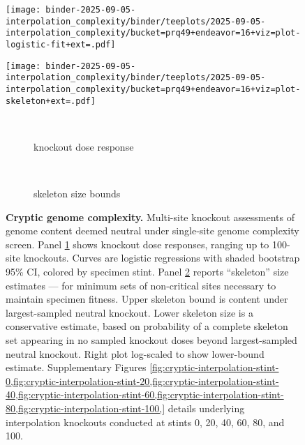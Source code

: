 \begin{figure}

\begin{minipage}{\linewidth}
\centering
\begin{minipage}{0.4\linewidth}
\texttt{[image: binder-2025-09-05-interpolation\_complexity/binder/teeplots/2025-09-05-interpolation\_complexity/bucket=prq49+endeavor=16+viz=plot-logistic-fit+ext=.pdf]}
\end{minipage}%
\begin{minipage}{0.6\linewidth}
\texttt{[image: binder-2025-09-05-interpolation\_complexity/binder/teeplots/2025-09-05-interpolation\_complexity/bucket=prq49+endeavor=16+viz=plot-skeleton+ext=.pdf]}
\end{minipage}
\end{minipage}

\vspace{-1ex}\textsc{}

\begin{minipage}{\linewidth}
\centering
\begin{subfigure}[t]{0.05\linewidth}
~
\end{subfigure}%
\begin{subfigure}[t]{0.4\linewidth}
\centering
\caption{\footnotesize knockout dose response}
\label{fig:cryptic:logistic}
\end{subfigure}%
\begin{subfigure}[t]{0.05\linewidth}
~
\end{subfigure}%
\begin{subfigure}[t]{0.5\linewidth}
\centering
\caption{\footnotesize skeleton size bounds}
\label{fig:cryptic:skeleton}
\end{subfigure}
\end{minipage}

\caption{
\textbf{Cryptic genome complexity.}
\footnotesize
Multi-site knockout assessments of genome content deemed neutral under single-site genome complexity screen.
Panel \ref{fig:cryptic:logistic} shows knockout dose responses, ranging up to 100-site knockouts.
Curves are logistic regressions with shaded bootstrap 95\% CI, colored by specimen stint.
Panel \ref{fig:cryptic:skeleton} reports ``skeleton'' size estimates --- for minimum sets of non-critical sites necessary to maintain specimen fitness.
Upper skeleton bound is content under largest-sampled neutral knockout.
Lower skeleton size is a conservative estimate, based on probability of a complete skeleton set appearing in no sampled knockout doses beyond largest-sampled neutral knockout.
Right plot log-scaled to show lower-bound estimate.
Supplementary Figures \cref{fig:cryptic-interpolation-stint-0,fig:cryptic-interpolation-stint-20,fig:cryptic-interpolation-stint-40,fig:cryptic-interpolation-stint-60,fig:cryptic-interpolation-stint-80,fig:cryptic-interpolation-stint-100,} details underlying interpolation knockouts conducted at stints 0, 20, 40, 60, 80, and 100.
}
\label{fig:cryptic}

\end{figure}
